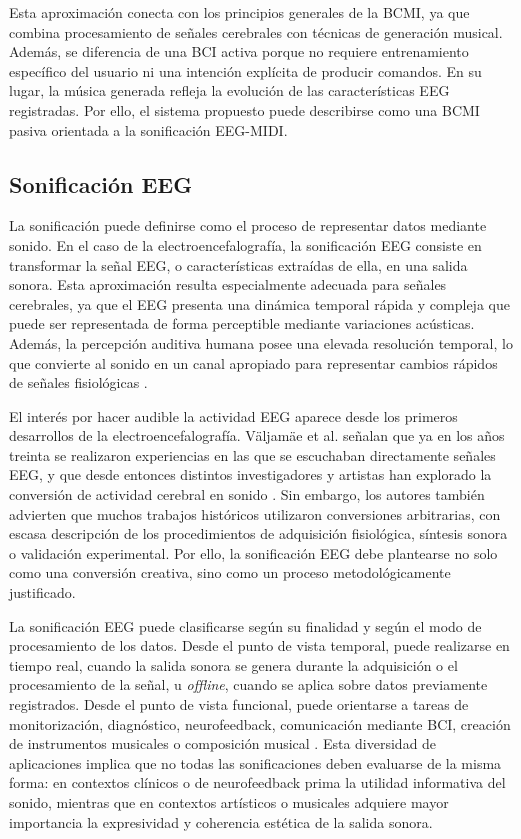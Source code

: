 \documentclass[../main.tex]{subfiles}
\begin{document}
Esta aproximación conecta con los principios generales de la BCMI, ya que combina procesamiento de señales cerebrales con técnicas de generación musical. Además, se diferencia de una BCI activa porque no requiere entrenamiento específico del usuario ni una intención explícita de producir comandos. En su lugar, la música generada refleja la evolución de las características EEG registradas. Por ello, el sistema propuesto puede describirse como una BCMI pasiva orientada a la sonificación EEG-MIDI.

\subsection{Sonificación EEG}

La sonificación puede definirse como el proceso de representar datos mediante sonido. En el caso de la electroencefalografía, la sonificación EEG consiste en transformar la señal EEG, o características extraídas de ella, en una salida sonora. Esta aproximación resulta especialmente adecuada para señales cerebrales, ya que el EEG presenta una dinámica temporal rápida y compleja que puede ser representada de forma perceptible mediante variaciones acústicas. Además, la percepción auditiva humana posee una elevada resolución temporal, lo que convierte al sonido en un canal apropiado para representar cambios rápidos de señales fisiológicas \cite{Valjamae2013EEGSonification}.

El interés por hacer audible la actividad EEG aparece desde los primeros desarrollos de la electroencefalografía. Väljamäe et al. señalan que ya en los años treinta se realizaron experiencias en las que se escuchaban directamente señales EEG, y que desde entonces distintos investigadores y artistas han explorado la conversión de actividad cerebral en sonido \cite{Valjamae2013EEGSonification}. Sin embargo, los autores también advierten que muchos trabajos históricos utilizaron conversiones arbitrarias, con escasa descripción de los procedimientos de adquisición fisiológica, síntesis sonora o validación experimental. Por ello, la sonificación EEG debe plantearse no solo como una conversión creativa, sino como un proceso metodológicamente justificado.

La sonificación EEG puede clasificarse según su finalidad y según el modo de procesamiento de los datos. Desde el punto de vista temporal, puede realizarse en tiempo real, cuando la salida sonora se genera durante la adquisición o el procesamiento de la señal, u \textit{offline}, cuando se aplica sobre datos previamente registrados. Desde el punto de vista funcional, puede orientarse a tareas de monitorización, diagnóstico, neurofeedback, comunicación mediante BCI, creación de instrumentos musicales o composición musical \cite{Valjamae2013EEGSonification}. Esta diversidad de aplicaciones implica que no todas las sonificaciones deben evaluarse de la misma forma: en contextos clínicos o de neurofeedback prima la utilidad informativa del sonido, mientras que en contextos artísticos o musicales adquiere mayor importancia la expresividad y coherencia estética de la salida sonora.
\end{document}
